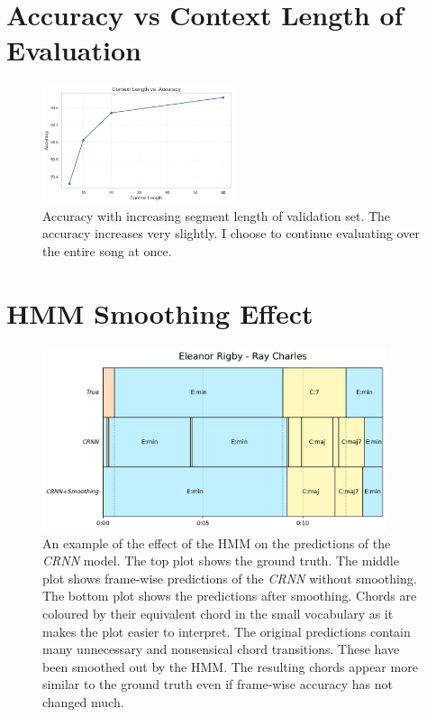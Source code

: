 \section{Accuracy vs Context Length of Evaluation}\label{app:accuracy_vs_context_length}

\begin{figure}[H]
    \centering
    \includegraphics[width=0.5\textwidth]{figures/context_length_vs_accuracy.png}
    \caption{Accuracy with increasing segment length of validation set. The accuracy increases very slightly. I choose to continue evaluating over the entire song at once.}
    \label{fig:accuracy_vs_context_length}
\end{figure}

\section{HMM Smoothing Effect}\label{app:hmm_smoothing_effect}

\begin{figure}[H]
    \centering
    \hspace{-1.5cm}
    \includegraphics[width=0.9\textwidth]{figures/hmm_smoothing_example.png}
    \caption{An example of the effect of the HMM on the predictions of the \emph{CRNN} model. The top plot shows the ground truth. The middle plot shows frame-wise predictions of the \emph{CRNN} without smoothing. The bottom plot shows the predictions after smoothing. Chords are coloured by their equivalent chord in the small vocabulary as it makes the plot easier to interpret. The original predictions contain many unnecessary and nonsensical chord transitions. These have been smoothed out by the HMM. The resulting chords appear more similar to the ground truth even if frame-wise accuracy has not changed much.}\label{fig:hmm_smoothing_example}
\end{figure}

